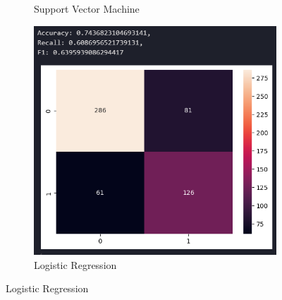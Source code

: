 \documentclass[12pt]{report}
\begin{document}
\begin{figure}[H]
\begin{subfigure}[b]{0.3\textwidth}
        \caption{Support Vector Machine}
        \label{fig:SVMUnseen}
    \end{subfigure}
    \hfill
    \begin{subfigure}[b]{0.3\textwidth}
        \includegraphics[width=\textwidth]{ModelDev/Iteration1/Matrices/Unseen/MetricsIncluded/LR.png}
        \caption{Logistic Regression}
        \label{fig:LRUnseen}
    \end{subfigure}
    
    \vspace{1em}
    

\end{figure}
\end{document}
